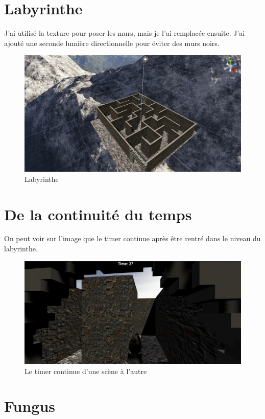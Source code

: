 \documentclass[12pt, french]{article}
\begin{document}
\section{Labyrinthe}

J'ai utilisé la texture pour poser les murs, mais je l'ai remplacée ensuite. J'ai ajouté une seconde lumière directionnelle pour éviter des murs noirs.

\begin{figure}[h]
\centering
\includegraphics[width = 0.9\linewidth]{laby}
\caption{Labyrinthe}
\end{figure}

\clearpage
\section{De la continuité du temps}

On peut voir sur l'image que le timer continue après être rentré dans le niveau du labyrinthe.

\begin{figure}[h]
\centering
\includegraphics[width = \linewidth]{timer}
\caption{Le timer continue d'une scène à l'autre}
\end{figure}

\section{Fungus}
\end{document}
